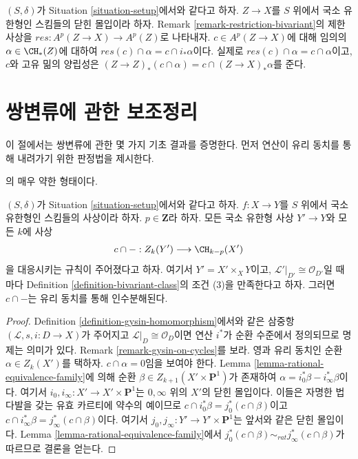 \begin{remark}
\label{remark-res-push}
$(S, \delta)$가 Situation \ref{situation-setup}에서와 같다고 하자.
$Z \to X$를 $S$ 위에서 국소 유한형인 스킴들의 닫힌 몰입이라 하자.
Remark \ref{remark-restriction-bivariant}의 제한 사상을
$res : A^p(Z \to X) \to A^p(Z)$로 나타내자. $c \in A^p(Z \to X)$에 대해
임의의 $\alpha \in \CH_*(Z)$에 대하여
$res(c) \cap \alpha = c \cap i_*\alpha$이다. 실제로
$res(c) \cap \alpha = c \cap \alpha$이고, $c$와 고유 밂의 양립성은
$(Z \to Z)_*(c \cap \alpha) = c \cap (Z \to X)_*\alpha$를 준다.
\end{remark}






\section{쌍변류에 관한 보조정리}
\label{section-bivariant-II}

\noindent
이 절에서는 쌍변류에 관한 몇 가지 기초 결과를 증명한다. 먼저 연산이
유리 동치를 통해 내려가기 위한 판정법을 제시한다.

\begin{lemma}
\label{lemma-factors-through-rational-equivalence}
\begin{reference}
\cite[Theorem 17.1]{F}의 매우 약한 형태이다.
\end{reference}
$(S, \delta)$가 Situation \ref{situation-setup}에서와 같다고 하자.
$f : X \to Y$를 $S$ 위에서 국소 유한형인 스킴들의 사상이라 하자.
$p \in \mathbf{Z}$라 하자. 모든 국소 유한형 사상 $Y' \to Y$와 모든
$k$에 사상
$$
c \cap - : Z_k(Y') \longrightarrow \CH_{k - p}(X')
$$
을 대응시키는 규칙이 주어졌다고 하자. 여기서
$Y' = X' \times_X Y$이고, $\mathcal{L}'|_{D'} \cong \mathcal{O}_{D'}$일
때마다 Definition \ref{definition-bivariant-class}의 조건 (3)을
만족한다고 하자. 그러면 $c \cap -$는 유리 동치를 통해 인수분해된다.
\end{lemma}

\begin{proof}
Definition \ref{definition-gysin-homomorphism}에서와 같은 삼중항
$(\mathcal{L}, s, i : D \to X)$가 주어지고
$\mathcal{L}|_D \cong \mathcal{O}_D$이면 연산 $i^*$가 순환 수준에서
정의되므로 명제는 의미가 있다. Remark \ref{remark-gysin-on-cycles}를
보라. 영과 유리 동치인 순환 $\alpha \in Z_k(X')$를 택하자.
$c \cap \alpha = 0$임을 보여야 한다. Lemma
\ref{lemma-rational-equivalence-family}에 의해 순환
$\beta \in Z_{k + 1}(X' \times \mathbf{P}^1)$가 존재하여
$\alpha = i_0^*\beta - i_\infty^*\beta$이다. 여기서
$i_0, i_\infty : X' \to X' \times \mathbf{P}^1$는 $0, \infty$ 위의
$X'$의 닫힌 몰입이다. 이들은 자명한 법다발을 갖는 유효 카르티에
약수의 예이므로
$c \cap i_0^*\beta = j_0^*(c \cap \beta)$이고
$c \cap i_\infty^*\beta = j_\infty^*(c \cap \beta)$이다. 여기서
$j_0, j_\infty : Y' \to Y' \times \mathbf{P}^1$는 앞서와 같은 닫힌
몰입이다. Lemma \ref{lemma-rational-equivalence-family}에서
$j_0^*(c \cap \beta) \sim_{rat} j_\infty^*(c \cap \beta)$가 따르므로
결론을 얻는다.
\end{proof}

